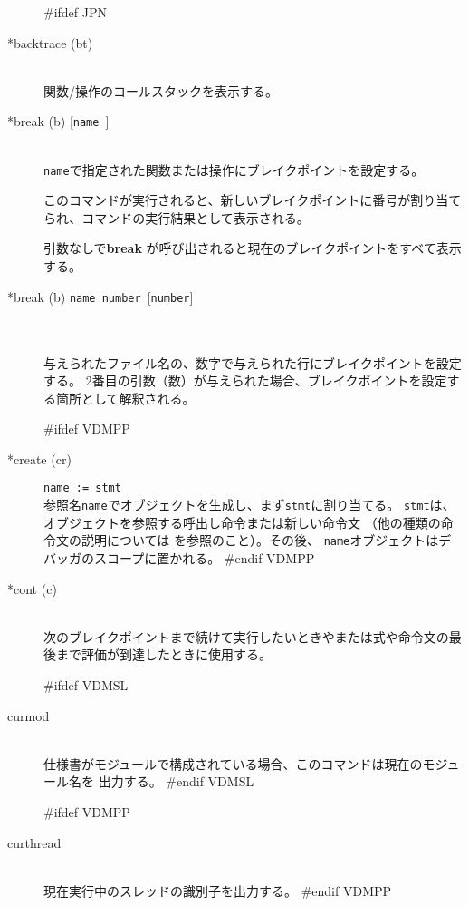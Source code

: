 \documentclass[\pformat,12pt]{article}
\begin{document}
\begin{description}
#ifdef JPN
\item[*backtrace (bt)] \mbox{}\\
  関数/操作のコールスタックを表示する。
  
\item[*break (b) \mbox{[{\tt name }]}] 
\mbox{}\\
  {\tt name}で指定された関数または操作にブレイクポイントを設定する。\\
  
  このコマンドが実行されると、新しいブレイクポイントに番号が割り当てられ、コマンドの実行結果として表示される。

  引数なしで\textbf{break} が呼び出されると現在のブレイクポイントをすべて表示する。

\item[*break (b) \mbox{\texttt{name number} [\texttt{number}]}]\mbox{}\\
\mbox{}\\
 与えられたファイル名の、数字で与えられた行にブレイクポイントを設定する。
 2番目の引数（数）が与えられた場合、ブレイクポイントを設定する箇所として解釈される。
 
#ifdef VDMPP
\item[*create (cr)] {\tt name := stmt}\mbox{}\\
  参照名{\tt name}でオブジェクトを生成し、まず{\tt stmt}に割り当てる。
  {\tt stmt}は、オブジェクトを参照する呼出し命令または新しい命令文
  （他の種類の命令文の説明については\cite{LangManPP-CSK} を参照のこと）。その後、
  {\tt name}オブジェクトはデバッガのスコープに置かれる。
#endif VDMPP

\item[*cont (c)] \mbox{}\\
  次のブレイクポイントまで続けて実行したいときやまたは式や命令文の最後まで評価が到達したときに使用する。

#ifdef VDMSL
\item[curmod] \mbox{}\\
  仕様書がモジュールで構成されている場合、このコマンドは現在のモジュール名を
  出力する。
#endif VDMSL

#ifdef VDMPP
\item[curthread]\mbox{}\\
  現在実行中のスレッドの識別子を出力する。
#endif VDMPP


\end{description}
\end{document}
